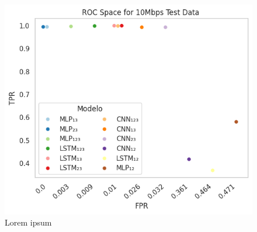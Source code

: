 \begin{subfigure}{0.25\textwidth}
	\centering
	\includegraphics[width=1.0\textwidth]{./figs/ROC-Space-Test-Data-10Mbps.png}
	\caption{Lorem ipsum}
\end{subfigure}

